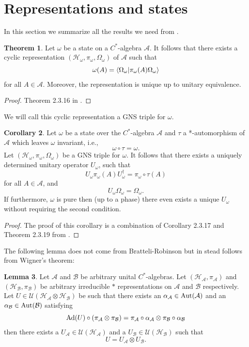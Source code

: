 \documentclass[12pt,a4paper,twoside]{article}
\let\originalleft\left
\let\originalright\right
\renewcommand{\left}{\mathopen{}\mathclose\bgroup\originalleft}
\renewcommand{\right}{\aftergroup\egroup\originalright}
\newcommand{\UU}{\mathcal U}
\newcommand{\BB}{\mathcal B}
\newcommand{\HH}{\mathcal H}
\renewcommand{\AA}{\mathcal A}
\newcommand{\Ad}[1]{\textrm{Ad}\left(#1\right)}
\newcommand{\Aut}[1]{\textrm{Aut}\left(#1\right)}
\theoremstyle{definition}
\newtheorem{theorem}{Theorem}[section]
\newtheorem{lemma}[theorem]{Lemma}
\newtheorem{corollary}[theorem]{Corollary}
\numberwithin{equation}{section}
\begin{document}
\section{Representations and states}
In this section we summarize all the results we need from \cite{bratteli1979operator}.
\begin{theorem}\label{thrm:ExistenceGNS}
	Let $\omega$ be a state on a $C^*$-algebra $\AA$. It follows that there exists a cyclic representation $(\HH_\omega,\pi_\omega,\Omega_\omega)$ of $\AA$ such that
	\[\omega(A)=\bra{\Omega_\omega}\ket{\pi_\omega(A)\Omega_\omega}\]
	for all $A\in\AA$. Moreover, the representation is unique up to unitary equivalence.
\end{theorem}
\begin{proof}
	Theorem 2.3.16 in \cite{bratteli1979operator}.
\end{proof}
We will call this cyclic representation a GNS triple for $\omega$.
\begin{corollary}\label{cor:ExistenceOfUnitary}
	Let $\omega$ be a state over the $C^*$-algebra $\AA$ and $\tau$ a *-automorphism of $\AA$ which leaves $\omega$ invariant, i.e.,
	\[\omega\circ\tau=\omega.\]
	Let $(\HH_\omega,\pi_\omega,\Omega_\omega)$ be a GNS triple for $\omega$. It follows that there exists a uniquely determined unitary operator $U_\omega$, such that
	\[U_\omega \pi_\omega(A)U_\omega^\dagger=\pi_\omega\circ\tau(A) \]
	for all $A\in\AA$, and
	\[U_\omega\Omega_\omega=\Omega_\omega. \]
	If furthermore, $\omega$ is pure then (up to a phase) there even exists a unique $U_\omega$ without requiring the second condition.
\end{corollary}
\begin{proof}
	The proof of this corollary is a combination of Corollary 2.3.17 and Theorem 2.3.19 from \cite{bratteli1979operator}.
\end{proof}
The following lemma does not come from Bratteli-Robinson but in stead follows from Wigner's theorem:
\begin{lemma}\label{lem:SplittingOfUnitary}
	Let $\AA$ and $\BB$ be arbitrary unital $C^*$-algebras. Let $(\HH_\AA,\pi_\AA)$ and $(\HH_\BB,\pi_\BB)$ be arbitrary irreducible $*$ representations on $\AA$ and $\BB$ respectively. Let $U\in\UU(\HH_\AA\otimes\HH_\BB)$ be such that there exists an $\alpha_\AA\in\Aut{\AA}$ and an $\alpha_\BB\in\Aut{\BB}$ satisfying
	\begin{equation}
		\Ad{U}\circ(\pi_\AA\otimes\pi_\BB)=\pi_\AA\circ\alpha_\AA\otimes\pi_\BB\circ\alpha_\BB
	\end{equation}
	then there exists a $U_\AA\in\UU(\HH_\AA)$ and a $U_\BB\in\UU(\HH_\BB)$ such that
	\begin{equation}
		U=U_\AA\otimes U_\BB.
	\end{equation}
\end{lemma}
\end{document}
